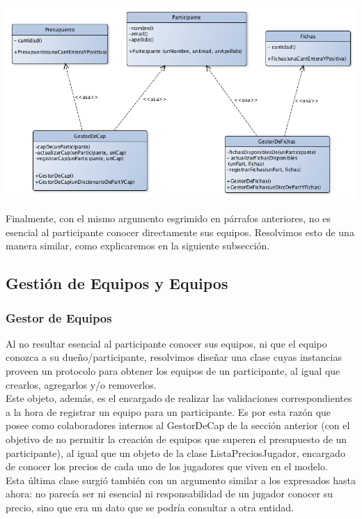 \begin{center}
\includegraphics[scale=0.4]{diseno/gestorDeCapYFichas.png} 
\end{center}

Finalmente, con el mismo argumento esgrimido en párrafos anteriores, no es esencial al participante conocer directamente sus equipos. Resolvimos esto de una manera similar, como explicaremos en la siguiente subsección.\\


\subsection{Gestión de Equipos y Equipos}

\subsubsection{Gestor de Equipos}
Al no resultar esencial al participante conocer sus equipos, ni que el equipo conozca a su dueño/participante, resolvimos diseñar una clase cuyas instancias proveen un protocolo para obtener los equipos de un participante, al igual que crearlos, agregarlos y/o removerlos.\\
Este objeto, además, es el encargado de realizar las validaciones correspondientes a la hora de registrar un equipo para un participante. Es por esta razón que posee como colaboradores internos al GestorDeCap de la sección anterior (con el objetivo de no permitir la creación de equipos que superen el presupuesto de un participante), al igual que un objeto de la clase ListaPreciosJugador, encargado de conocer los precios de cada uno de los jugadores que viven en el modelo.\\
Esta última clase surgió también con un argumento similar a los expresados hasta ahora: no parecía ser ni esencial ni responsabilidad de un jugador conocer su precio, sino que era un dato que se podría consultar a otra entidad.\\

